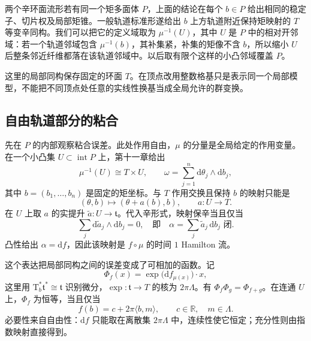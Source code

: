 两个辛环面流形若有同一个矩多面体 \(P\)，上面的结论在每个 \(b\in P\) 给出相同的稳定子、切片权及局部矩锥。一般轨道标准形遂给出 \(b\) 上方轨道附近保持矩映射的 \(T\) 等变辛同构。我们可以把它的定义域取为 \(\mu^{-1}(U)\)，其中 \(U\) 是 \(P\) 中的相对开邻域：若一个轨道邻域包含 \(\mu^{-1}(b)\)，其补集紧，补集的矩像不含 \(b\)，所以缩小 \(U\) 后整条邻近纤维都落在该轨道邻域中。以后取有限个这样的小凸邻域覆盖 \(P\)。

\ProseParagraphBreak

这里的局部同构保存固定的环面 \(T\)。在顶点改用整数格基只是表示同一个局部模型，不能把不同顶点处任意的实线性换基当成全局允许的群变换。

\subsection{自由轨道部分的粘合}
\label{g4:subsec:1204:02}
先在 \(P\) 的内部观察粘合误差。此处作用自由，\(\mu\) 的分量是全局给定的作用变量。在一个小凸集 \(U\subset\operatorname{int}P\) 上，第十一章给出
\[
	\mu^{-1}(U)\cong T\times U,\qquad
	\omega=\sum_{j=1}^n\mathrm{d}\theta_j\wedge\mathrm{d}b_j,
\]
其中 \(b=(b_1,\ldots,b_n)\) 是固定的矩坐标。与 \(T\) 作用交换且保持 \(b\) 的映射只能是
\begin{equation}\label{g4:eq:1204:phase-translation}
	(\theta,b)\longmapsto(\theta+a(b),b),\qquad a:U\to T.
\end{equation}
在 \(U\) 上取 \(a\) 的实提升 \(\widetilde a:U\to\mathfrak t\)。代入辛形式，映射保辛当且仅当
\begin{equation}\label{g4:eq:1204:closed-phase}
	\sum_j\mathrm{d}\widetilde a_j\wedge\mathrm{d}b_j=0,
	\quad\text{即}\quad
	\alpha=\sum_j\widetilde a_j\,\mathrm{d}b_j\text{ 闭}.
\end{equation}
凸性给出 \(\alpha=\mathrm{d}f\)，因此该映射是 \(f\circ\mu\) 的时间 \(1\) Hamilton 流。

\ProseParagraphBreak

这个表达把局部同构之间的误差变成了可相加的函数。记
\begin{equation}\label{g4:eq:1204:hamilton-automorphism}
	\Phi_f(x)=\exp\bigl(\mathrm{d}f_{\mu(x)}\bigr)\cdot x,
\end{equation}
这里用 \(\mathrm{T}_b^*\mathfrak t^*\cong\mathfrak t\) 识别微分，\(\exp:\mathfrak t\to T\) 的核为 \(2\pi\Lambda\)。有 \(\Phi_f\Phi_g=\Phi_{f+g}\)。在连通 \(U\) 上，\(\Phi_f\) 为恒等，当且仅当
\begin{equation}\label{g4:eq:1204:affine-kernel}
	f(b)=c+2\pi\langle b,m\rangle,
	\qquad c\in\mathbb R,\quad m\in\Lambda.
\end{equation}
必要性来自自由性：\(\mathrm{d}f\) 只能取在离散集 \(2\pi\Lambda\) 中，连续性使它恒定；充分性则由指数映射直接得到。

